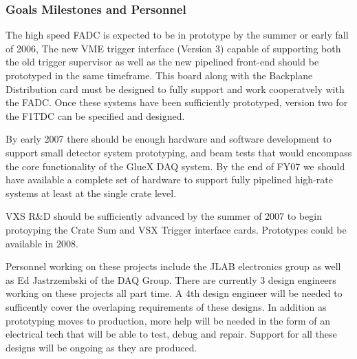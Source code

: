 \documentclass[10pt]{article}
\begin{document}
\subsubsection*{Goals Milestones and Personnel}

The high speed FADC is expected to be in prototype by the summer or early fall of 2006,
The new VME trigger interface (Version 3) capable of supporting both the old
trigger supervisor as well as the new pipelined front-end should be prototyped in the
same timeframe. This board along with the Backplane Distribution card must be designed
to fully support and work cooperatvely with the FADC. Once these systems have been 
sufficiently prototyped, version two for the F1TDC can be specified and designed. 

By early 2007 there should be enough hardware and software development to
support small detector system prototyping, and beam tests that would
encompass the core functionality of the GlueX DAQ system. By the end of FY07 we should
have available a complete set of hardware to support fully pipelined high-rate
systems at least at the single crate level.

VXS R\&D should be sufficiently advanced by the summer of 2007 to begin protoyping the
Crate Sum and VSX Trigger interface cards. Prototypes could be available in 2008.

Personnel working on these projects include the JLAB electronics group as well as Ed Jastrzembski
of the DAQ Group. There are currently 3 design engineers working on these projects all part time.
A 4th design engineer will be needed to sufficently cover the overlaping requirements of these
designs. In addition as prototyping moves to production, more help will be needed in
the form of an electrical tech that will be able to test, debug and repair. Support for all
these designs will be ongoing as they are produced.
\end{document}
